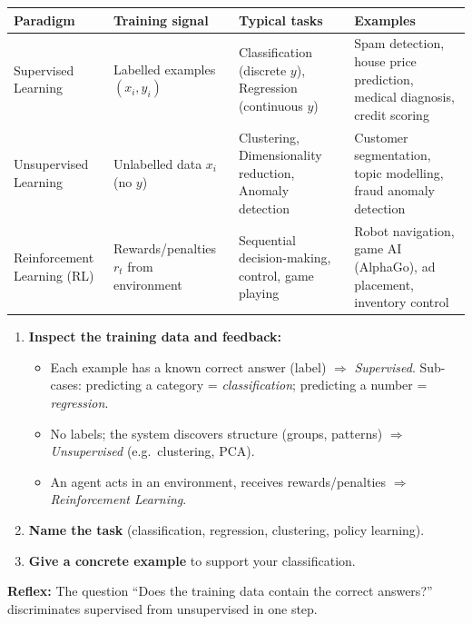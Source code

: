 \documentclass[11pt]{article}
\begin{document}
\begin{aretenir}
\begin{center}
\begin{tabularx}{\linewidth}{|l|X|X|X|}
\hline
\rowcolor{popblueL} \textbf{Paradigm} & \textbf{Training signal} & \textbf{Typical tasks} & \textbf{Examples} \\
\hline
Supervised Learning & Labelled examples $(x_i, y_i)$ & Classification (discrete $y$), Regression (continuous $y$) & Spam detection, house price prediction, medical diagnosis, credit scoring \\
\hline
Unsupervised Learning & Unlabelled data $x_i$ (no $y$) & Clustering, Dimensionality reduction, Anomaly detection & Customer segmentation, topic modelling, fraud anomaly detection \\
\hline
Reinforcement Learning (RL) & Rewards/penalties $r_t$ from environment & Sequential decision-making, control, game playing & Robot navigation, game AI (AlphaGo), ad placement, inventory control \\
\hline
\end{tabularx}
\end{center}
\end{aretenir}

\begin{methode}
\begin{enumerate}
\item \textbf{Inspect the training data and feedback:}
\begin{itemize}
\item Each example has a known correct answer (label) $\Rightarrow$ \emph{Supervised}. Sub-cases: predicting a category = \emph{classification}; predicting a number = \emph{regression}.
\item No labels; the system discovers structure (groups, patterns) $\Rightarrow$ \emph{Unsupervised} (e.g.\ clustering, PCA).
\item An agent acts in an environment, receives rewards/penalties $\Rightarrow$ \emph{Reinforcement Learning}.
\end{itemize}
\item \textbf{Name the task} (classification, regression, clustering, policy learning).
\item \textbf{Give a concrete example} to support your classification.
\end{enumerate}
\textbf{Reflex:} The question ``Does the training data contain the correct answers?'' discriminates supervised from unsupervised in one step.
\end{methode}
\end{document}
